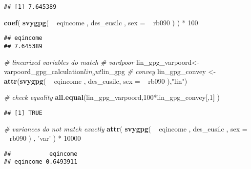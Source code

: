 \documentclass[]{book}
\newenvironment{Shaded}{\begin{snugshade}}{\end{snugshade}}
\newcommand{\KeywordTok}[1]{\textcolor[rgb]{0.13,0.29,0.53}{\textbf{{#1}}}}
\newcommand{\DataTypeTok}[1]{\textcolor[rgb]{0.13,0.29,0.53}{{#1}}}
\newcommand{\DecValTok}[1]{\textcolor[rgb]{0.00,0.00,0.81}{{#1}}}
\newcommand{\StringTok}[1]{\textcolor[rgb]{0.31,0.60,0.02}{{#1}}}
\newcommand{\CommentTok}[1]{\textcolor[rgb]{0.56,0.35,0.01}{\textit{{#1}}}}
\newcommand{\NormalTok}[1]{{#1}}
\theoremstyle{definition}
\theoremstyle{definition}
\theoremstyle{remark}
\begin{document}
\begin{verbatim}
## [1] 7.645389
\end{verbatim}

\begin{Shaded}
\begin{Highlighting}[]
\KeywordTok{coef}\NormalTok{( }\KeywordTok{svygpg}\NormalTok{( ~}\StringTok{ }\NormalTok{eqincome , des_eusilc , }\DataTypeTok{sex =} \NormalTok{~}\StringTok{ }\NormalTok{rb090 ) ) *}\StringTok{ }\DecValTok{100}
\end{Highlighting}
\end{Shaded}

\begin{verbatim}
## eqincome 
## 7.645389
\end{verbatim}

\begin{Shaded}
\begin{Highlighting}[]
\CommentTok{# linearized variables do match}
\CommentTok{# vardpoor}
\NormalTok{lin_gpg_varpoord<-}\StringTok{ }\NormalTok{varpoord_gpg_calculation$lin_out$lin_gpg}
\CommentTok{# convey }
\NormalTok{lin_gpg_convey <-}\StringTok{ }\KeywordTok{attr}\NormalTok{(}\KeywordTok{svygpg}\NormalTok{( ~}\StringTok{ }\NormalTok{eqincome , des_eusilc, }\DataTypeTok{sex =} \NormalTok{~}\StringTok{ }\NormalTok{rb090 ),}\StringTok{"lin"}\NormalTok{)}

\CommentTok{# check equality}
\KeywordTok{all.equal}\NormalTok{(lin_gpg_varpoord,}\DecValTok{100}\NormalTok{*lin_gpg_convey[,}\DecValTok{1}\NormalTok{] )}
\end{Highlighting}
\end{Shaded}

\begin{verbatim}
## [1] TRUE
\end{verbatim}

\begin{Shaded}
\begin{Highlighting}[]
\CommentTok{# variances do not match exactly}
\KeywordTok{attr}\NormalTok{( }\KeywordTok{svygpg}\NormalTok{( ~}\StringTok{ }\NormalTok{eqincome , des_eusilc , }\DataTypeTok{sex =} \NormalTok{~}\StringTok{ }\NormalTok{rb090 ) , }\StringTok{'var'} \NormalTok{) *}\StringTok{ }\DecValTok{10000}
\end{Highlighting}
\end{Shaded}

\begin{verbatim}
##           eqincome
## eqincome 0.6493911
\end{verbatim}
\end{document}
